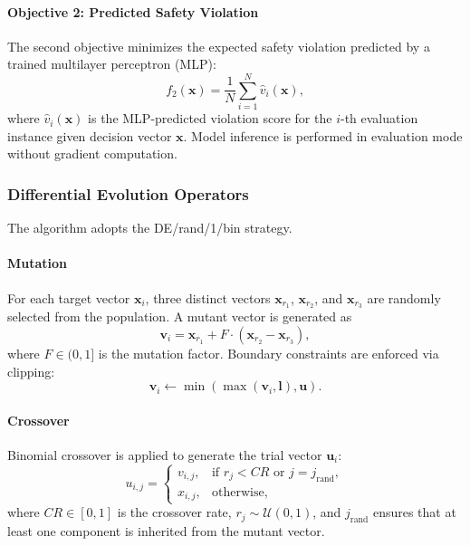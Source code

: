 \documentclass[conference]{IEEEtran}
\begin{document}
\paragraph{Objective 2: Predicted Safety Violation}

The second objective minimizes the expected safety violation predicted by a trained multilayer perceptron (MLP):
\begin{equation}
f_2(\mathbf{x}) = \frac{1}{N} \sum_{i=1}^{N} \hat{v}_i(\mathbf{x}),
\end{equation}
where $\hat{v}_i(\mathbf{x})$ is the MLP-predicted violation score for the $i$-th evaluation instance given decision vector $\mathbf{x}$. Model inference is performed in evaluation mode without gradient computation.

\subsubsection{Differential Evolution Operators}

The algorithm adopts the DE/rand/1/bin strategy.

\paragraph{Mutation}

For each target vector $\mathbf{x}_i$, three distinct vectors $\mathbf{x}_{r_1}$, $\mathbf{x}_{r_2}$, and $\mathbf{x}_{r_3}$ are randomly selected from the population. A mutant vector is generated as
\begin{equation}
\mathbf{v}_i = \mathbf{x}_{r_1} + F \cdot (\mathbf{x}_{r_2} - \mathbf{x}_{r_3}),
\end{equation}
where $F \in (0,1]$ is the mutation factor. Boundary constraints are enforced via clipping:
\begin{equation}
\mathbf{v}_i \leftarrow \min\left(\max(\mathbf{v}_i, \mathbf{l}), \mathbf{u}\right).
\end{equation}

\paragraph{Crossover}

Binomial crossover is applied to generate the trial vector $\mathbf{u}_i$:
\begin{equation}
u_{i,j} =
\begin{cases}
v_{i,j}, & \text{if } r_j < CR \text{ or } j = j_{\text{rand}}, \\
x_{i,j}, & \text{otherwise},
\end{cases}
\end{equation}
where $CR \in [0,1]$ is the crossover rate, $r_j \sim \mathcal{U}(0,1)$, and $j_{\text{rand}}$ ensures that at least one component is inherited from the mutant vector.
\end{document}
